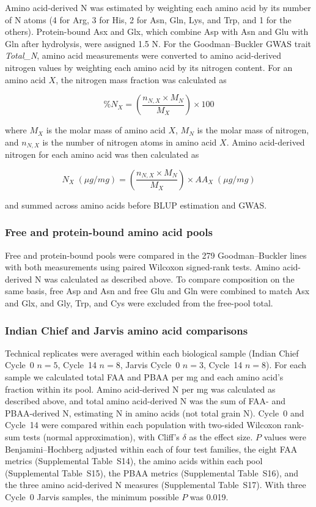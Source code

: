 \documentclass[namedate,unnumsec,webpdf,contemporary,large]{oup-authoring-template}
\begin{document}
Amino acid-derived N was estimated by weighting each amino acid by its number of N atoms (4 for Arg, 3 for His, 2 for Asn, Gln, Lys, and Trp, and 1 for the others). Protein-bound Asx and Glx, which combine Asp with Asn and Glu with Gln after hydrolysis, were assigned 1.5 N. For the Goodman--Buckler GWAS trait \textit{Total\_N}, amino acid measurements were converted to amino acid-derived nitrogen values by weighting each amino acid by its nitrogen content. For an amino acid $X$, the nitrogen mass fraction was calculated as

\[
\%N_X =
\left(
\frac{n_{N,X}\times M_N}{M_X}
\right)\times 100
\]

where $M_X$ is the molar mass of amino acid $X$, $M_N$ is the molar mass of nitrogen, and $n_{N,X}$ is the number of nitrogen atoms in amino acid $X$. Amino acid-derived nitrogen for each amino acid was then calculated as

\[
N_X\;(\mu g/mg) =
\left(
\frac{n_{N,X}\times M_N}{M_X}
\right)
\times AA_X\;(\mu g/mg)
\]

and summed across amino acids before BLUP estimation and GWAS.

\subsubsection{Free and protein-bound amino acid pools}
Free and protein-bound pools were compared in the 279 Goodman--Buckler lines with both measurements \citep{Shrestha2022} using paired Wilcoxon signed-rank tests. Amino acid-derived N was calculated as described above. To compare composition on the same basis, free Asp and Asn and free Glu and Gln were combined to match Asx and Glx, and Gly, Trp, and Cys were excluded from the free-pool total.

\subsubsection{Indian Chief and Jarvis amino acid comparisons}
Technical replicates were averaged within each biological sample (Indian Chief Cycle~0 $n = 5$, Cycle~14 $n = 8$, Jarvis Cycle~0 $n = 3$, Cycle~14 $n = 8$). For each sample we calculated total FAA and PBAA per mg and each amino acid’s fraction within its pool. Amino acid-derived N per mg was calculated as described above, and total amino acid-derived N was the sum of FAA- and PBAA-derived N, estimating N in amino acids (not total grain N). Cycle~0 and Cycle~14 were compared within each population with two-sided Wilcoxon rank-sum tests (normal approximation), with Cliff’s $\delta$ as the effect size. $P$ values were Benjamini--Hochberg adjusted within each of four test families, the eight FAA metrics (Supplemental Table~S14), the amino acids within each pool (Supplemental Table~S15), the PBAA metrics (Supplemental Table~S16), and the three amino acid-derived N measures (Supplemental Table~S17). With three Cycle~0 Jarvis samples, the minimum possible $P$ was 0.019.
\end{document}
